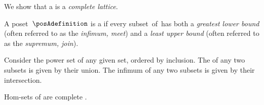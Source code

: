 We show that a \DP {} is a \emph{complete lattice}.

\begin{ctdefinition}
    \label{def:complete-lattice}
    A poset~$\posAdefinition$ is a  if every subset~\subA of~\posAset has both a \emph{greatest lower bound} (often referred to as the \emph{infimum, meet}) and a \emph{least upper bound} (often referred to as the \emph{supremum, join}).
\end{ctdefinition}

\begin{example}
    Consider the power set of any given set, ordered by inclusion.
    The  of any two subsets is given by their union.
    The infimum of any two subsets is given by their intersection.
\end{example}

\begin{lemma}
    \label{lem:DP-homsets-complete-lattice}
    Hom-sets of \DP are complete .
\end{lemma}

